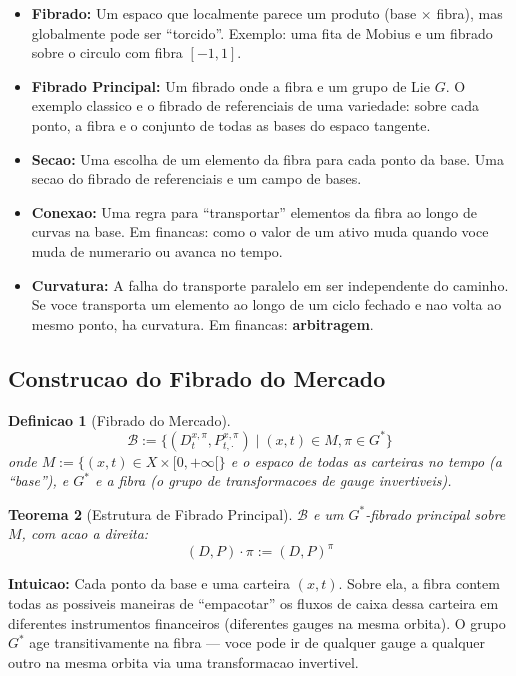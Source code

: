 \documentclass[12pt,a4paper]{article}
\newtheorem{teo}{Teorema}[section]
\newtheorem{defi}[teo]{Definicao}
\theoremstyle{remark}
\begin{document}
\begin{itemize}[nosep]
  \item \textbf{Fibrado:} Um espaco que localmente parece um produto
        (base $\times$ fibra), mas globalmente pode ser ``torcido''. Exemplo:
        uma fita de Mobius e um fibrado sobre o circulo com fibra $[-1,1]$.
  \item \textbf{Fibrado Principal:} Um fibrado onde a fibra e um grupo de Lie
        $G$. O exemplo classico e o fibrado de referenciais de uma variedade:
        sobre cada ponto, a fibra e o conjunto de todas as bases do espaco
        tangente.
  \item \textbf{Secao:} Uma escolha de um elemento da fibra para cada ponto
        da base. Uma secao do fibrado de referenciais e um campo de bases.
  \item \textbf{Conexao:} Uma regra para ``transportar'' elementos da fibra ao
        longo de curvas na base. Em financas: como o valor de um ativo muda
        quando voce muda de numerario ou avanca no tempo.
  \item \textbf{Curvatura:} A falha do transporte paralelo em ser independente
        do caminho. Se voce transporta um elemento ao longo de um ciclo fechado
        e nao volta ao mesmo ponto, ha curvatura. Em financas: \textbf{arbitragem}.
\end{itemize}

\subsection{Construcao do Fibrado do Mercado}

\begin{defi}[Fibrado do Mercado]
\[
\mathcal{B} := \{(D_t^{x,\pi}, P_{t,\cdot}^{x,\pi}) \mid (x,t) \in M, \pi \in G^*\}
\]
onde $M := \{(x,t) \in X \times [0,+\infty[\}$ e o espaco de todas as carteiras
no tempo (a ``base''), e $G^*$ e a fibra (o grupo de transformacoes de gauge
invertiveis).
\end{defi}

\begin{teo}[Estrutura de Fibrado Principal]
$\mathcal{B}$ e um $G^*$-fibrado principal sobre $M$, com acao a direita:
\[
(D,P) \cdot \pi := (D,P)^\pi
\]
\end{teo}

\textbf{Intuicao:} Cada ponto da base e uma carteira $(x,t)$. Sobre ela, a
fibra contem todas as possiveis maneiras de ``empacotar'' os fluxos de caixa
dessa carteira em diferentes instrumentos financeiros (diferentes gauges na
mesma orbita). O grupo $G^*$ age transitivamente na fibra — voce pode ir de
qualquer gauge a qualquer outro na mesma orbita via uma transformacao
invertivel.
\end{document}
